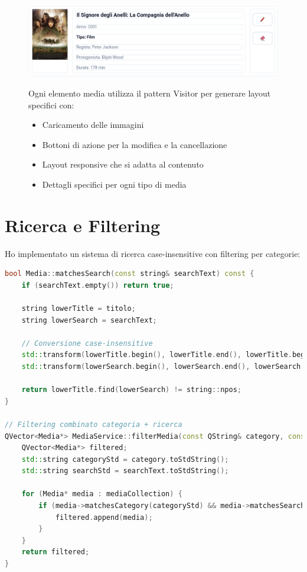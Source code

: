 \documentclass[a4paper,10pt]{article}
\begin{document}
\begin{figure}[ht!]
    \centering
    \begin{minipage}{0.4\textwidth}
        \includegraphics[width=\linewidth]{img/MediaItem.png}
    \end{minipage}\hfill
    \begin{minipage}{0.55\textwidth}
        \small
        Ogni elemento media utilizza il pattern Visitor per generare layout specifici con:
        \begin{itemize}
            \item Caricamento delle immagini
            \item Bottoni di azione per la modifica e la cancellazione
            \item Layout responsive che si adatta al contenuto
            \item Dettagli specifici per ogni tipo di media
        \end{itemize}
    \end{minipage}
\end{figure}

\section{Ricerca e Filtering}
Ho implementato un sistema di ricerca case-insensitive con filtering per categorie:

\begin{lstlisting}[language=cpp, style=cppstyle]
bool Media::matchesSearch(const string& searchText) const {
    if (searchText.empty()) return true;
    
    string lowerTitle = titolo;
    string lowerSearch = searchText;
    
    // Conversione case-insensitive
    std::transform(lowerTitle.begin(), lowerTitle.end(), lowerTitle.begin(), ::tolower);
    std::transform(lowerSearch.begin(), lowerSearch.end(), lowerSearch.begin(), ::tolower);
    
    return lowerTitle.find(lowerSearch) != string::npos;
}

// Filtering combinato categoria + ricerca
QVector<Media*> MediaService::filterMedia(const QString& category, const QString& searchText) const {
    QVector<Media*> filtered;
    std::string categoryStd = category.toStdString();
    std::string searchStd = searchText.toStdString();
    
    for (Media* media : mediaCollection) {
        if (media->matchesCategory(categoryStd) && media->matchesSearch(searchStd)) {
            filtered.append(media);
        }
    }
    return filtered;
}
\end{lstlisting}
\end{document}
